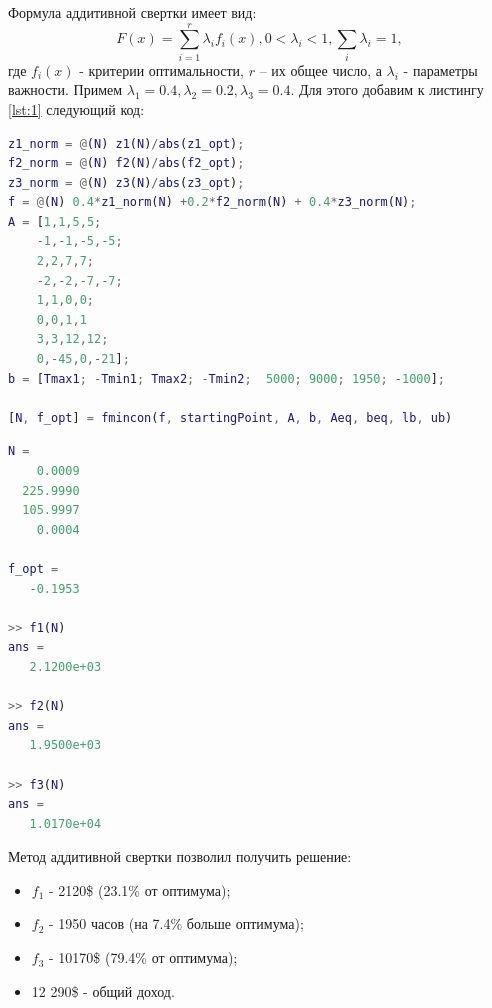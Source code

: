 Формула аддитивной свертки имеет вид:
\begin{equation}
F(x) = \sum_{i=1}^{r}\lambda_i f_i(x), 0<\lambda_i<1, \sum_i^{}\lambda_i=1,
\end{equation}
где $f_i(x)$ - критерии оптимальности, $r$ – их общее число, а $\lambda_i$ - параметры важности. Примем $\lambda_1=0.4, \lambda_2=0.2, \lambda_3=0.4$. Для этого добавим к листингу \ref{lst:1} следующий код:
\begin{lstlisting}[language={matlab}, caption={Аддитивная свертка}, label={lst:add}]
% Аддитивная свертка
z1_norm = @(N) z1(N)/abs(z1_opt);
f2_norm = @(N) f2(N)/abs(f2_opt);
z3_norm = @(N) z3(N)/abs(z3_opt);
f = @(N) 0.4*z1_norm(N) +0.2*f2_norm(N) + 0.4*z3_norm(N);
A = [1,1,5,5;
    -1,-1,-5,-5;
    2,2,7,7;
    -2,-2,-7,-7;
    1,1,0,0;
    0,0,1,1
    3,3,12,12;
    0,-45,0,-21];
b = [Tmax1; -Tmin1; Tmax2; -Tmin2;  5000; 9000; 1950; -1000];

[N, f_opt] = fmincon(f, startingPoint, A, b, Aeq, beq, lb, ub)
\end{lstlisting}
\begin{lstlisting}[language={matlab}, caption={Результаты выполнения листинга \ref{lst:add}}]
N =
    0.0009
  225.9990
  105.9997
    0.0004

f_opt =
   -0.1953
   
>> f1(N)
ans =
   2.1200e+03

>> f2(N)
ans =
   1.9500e+03

>> f3(N)
ans =
   1.0170e+04
\end{lstlisting}
Метод аддитивной свертки позволил получить решение:
\begin{itemize}
\item $f_1$ - 2120\$ (23.1\% от оптимума);
\item $f_2$ - 1950 часов (на 7.4\% больше оптимума);
\item $f_3$ - 10170\$ (79.4\% от оптимума);
\item 12 290\$ - общий доход.
\end{itemize}
